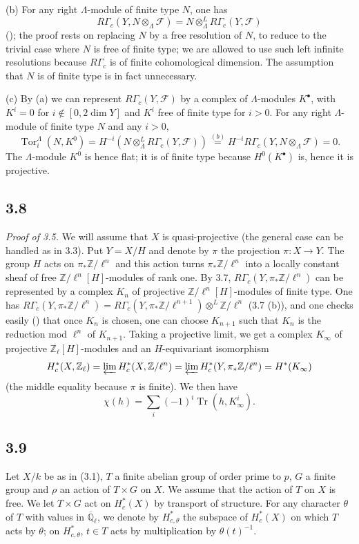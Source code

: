 \documentclass[11pt]{amsart}
\theoremstyle{plain}
\theoremstyle{remark}
\DeclareMathOperator{\Tr}{Tr}
\DeclareMathOperator{\Tor}{Tor}
\begin{document}
(b) For any right $\Lambda$-module of finite type $N$, one has
\[
R\Gamma_c(Y, N \otimes_\Lambda \mathcal{F}) = N \otimes_\Lambda^L R\Gamma_c(Y, \mathcal{F})
\]
(\cite[XVII (5.2.9)]{SGA4}); the proof rests on replacing $N$ by a free resolution of $N$, to reduce to the trivial case where $N$ is free of finite type; we are allowed to use such left infinite resolutions because $R\Gamma_c$ is of finite cohomological dimension. The assumption that $N$ is of finite type is in fact unnecessary.

(c) By (a) we can represent $R\Gamma_c(Y, \mathcal{F})$ by a complex of $\Lambda$-modules $K^\bullet$, with $K^i = 0$ for $i \notin [0, 2\dim Y]$ and $K^i$ free of finite type for $i > 0$. For any right $\Lambda$-module of finite type $N$ and any $i > 0$,
\[
\Tor_i^\Lambda(N, K^0) = H^{-i}(N \otimes_\Lambda^L R\Gamma_c(Y, \mathcal{F})) \overset{(b)}{=} H^{-i} R\Gamma_c(Y, N \otimes_\Lambda \mathcal{F}) = 0.
\]
The $\Lambda$-module $K^0$ is hence flat; it is of finite type because $H^0(K^\bullet)$ is, hence it is projective.

\subsection{3.8} \textit{Proof of 3.5.} We will assume that $X$ is quasi-projective (the general case can be handled as in 3.3). Put $Y = X/H$ and denote by $\pi$ the projection $\pi: X \to Y$. The group $H$ acts on $\pi_*\mathbb{Z}/\ell^n$ and this action turns $\pi_*\mathbb{Z}/\ell^n$ into a locally constant sheaf of free $\mathbb{Z}/\ell^n[H]$-modules of rank one. By 3.7, $R\Gamma_c(Y, \pi_*\mathbb{Z}/\ell^n)$ can be represented by a complex $K_n$ of projective $\mathbb{Z}/\ell^n[H]$-modules of finite type. One has $R\Gamma_c(Y, \pi_*\mathbb{Z}/\ell^n) = R\Gamma_c(Y, \pi_*\mathbb{Z}/\ell^{n+1}) \otimes^L \mathbb{Z}/\ell^n$ (3.7 (b)), and one checks easily (\cite[XV, 3.3, Lemme]{SGA4}) that once $K_n$ is chosen, one can choose $K_{n+1}$ such that $K_n$ is the reduction mod $\ell^n$ of $K_{n+1}$. Taking a projective limit, we get a complex $K_\infty$ of projective $\mathbb{Z}_\ell[H]$-modules and an $H$-equivariant isomorphism
\[
H_c^*(X, \mathbb{Z}_\ell) = \varprojlim H_c^*(X, \mathbb{Z}/\ell^n) = \varprojlim H_c^*(Y, \pi_*\mathbb{Z}/\ell^n) = H^*(K_\infty)
\]
(the middle equality because $\pi$ is finite). We then have
\[
\chi(h) = \sum_i (-1)^i \Tr(h, K_\infty^i).
\]

\subsection{3.9} Let $X/k$ be as in (3.1), $T$ a finite abelian group of order prime to $p$, $G$ a finite group and $\rho$ an action of $T \times G$ on $X$. We assume that the action of $T$ on $X$ is free. We let $T \times G$ act on $H_c^*(X)$ by transport of structure. For any character $\theta$ of $T$ with values in $\overline{\mathbb{Q}}_\ell$, we denote by $H_{c,\theta}^*$ the subspace of $H_c^*(X)$ on which $T$ acts by $\theta$; on $H_{c,\theta}^*$, $t \in T$ acts by multiplication by $\theta(t)^{-1}$.
\end{document}
